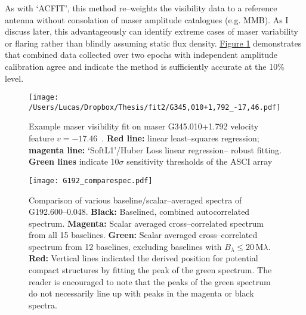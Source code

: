         As with `ACFIT', this method re--weights the visibility data to a reference antenna without consolation of maser amplitude catalogues (e.g. MMB). As I discuss later, this advantageously can identify extreme cases of maser variability or flaring rather than blindly assuming static flux density. \hyperref[fig:maserfitting]{Figure \ref*{fig:maserfitting}} demonstrates that combined data collected over two epochs with independent amplitude calibration agree and indicate the method is sufficiently accurate at the 10\% level. %
        
        \begin{figure}[h]
        	\centering
        	\texttt{[image: /Users/Lucas/Dropbox/Thesis/fit2/G345,010+1,792\_-17,46.pdf]}
        	\caption[Example visibility fitting]{Example maser visibility fit on maser G345.010+1.792 velocity feature $v=-17.46$~\kms. \textbf{Red line:} linear least--squares regression; \textbf{magenta line:} `SoftL1'/Huber Loss linear regression-- robust fitting. \textbf{Green lines} indicate $10\sigma$ sensitivity thresholds of the ASCI array}
        	\label{fig:maserfitting}
        \end{figure}
         
    
       
       
        
        \begin{figure}[h]
        	\centering
        	\texttt{[image: G192\_comparespec.pdf]} 
        	\caption[G192.600--0.048 spectrum]{Comparison of various baseline/scalar--averaged spectra of G192.600--0.048. {\bf Black:} Baselined, combined autocorrelated spectrum. {\bf Magenta:} Scalar averaged cross--correlated spectrum from all 15 baselines. {\bf Green:} Scalar averaged cross--correlated spectrum from 12 baselines, excluding baselines with $B_{\lambda}\le20$\,M$\lambda$. {\bf Red:} Vertical lines indicated the derived position for potential compact structures by fitting the peak of the green spectrum. The reader is encouraged to note that the peaks of the green spectrum do not necessarily line up with peaks in the magenta or black spectra.}
        	\label{fig:g192_spec}
        \end{figure} 
        
